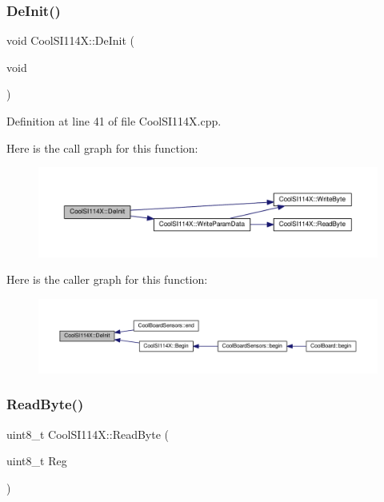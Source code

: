 \subsubsection{\texorpdfstring{De\+Init()}{DeInit()}}
{\footnotesize\ttfamily void Cool\+S\+I114\+X\+::\+De\+Init (\begin{DoxyParamCaption}\item[{void}]{ }\end{DoxyParamCaption})}



Definition at line 41 of file Cool\+S\+I114\+X.\+cpp.

Here is the call graph for this function\+:
\nopagebreak
\begin{figure}[H]
\begin{center}
\leavevmode
\includegraphics[width=350pt]{class_cool_s_i114_x_a6840abd53a2e3d71a6bb918077c6d6e6_cgraph}
\end{center}
\end{figure}
Here is the caller graph for this function\+:
\nopagebreak
\begin{figure}[H]
\begin{center}
\leavevmode
\includegraphics[width=350pt]{class_cool_s_i114_x_a6840abd53a2e3d71a6bb918077c6d6e6_icgraph}
\end{center}
\end{figure}
\mbox{\label{class_cool_s_i114_x_acc20f8037e156ec4aadcbe90780b1e8b}} 
\subsubsection{\texorpdfstring{Read\+Byte()}{ReadByte()}}
{\footnotesize\ttfamily uint8\+\_\+t Cool\+S\+I114\+X\+::\+Read\+Byte (\begin{DoxyParamCaption}\item[{uint8\+\_\+t}]{Reg }\end{DoxyParamCaption})\hspace{0.3cm}{\ttfamily [private]}}



